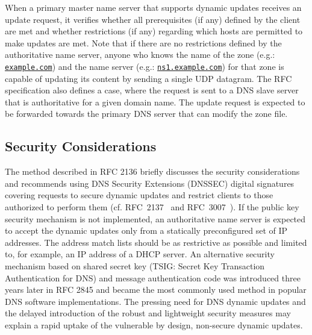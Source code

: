 When a primary master name server that supports dynamic updates receives an update request, it verifies whether all prerequisites (if any) defined by the %
client are met and whether restrictions (if any) regarding which hosts are permitted to make updates are met.
Note that if there are no restrictions defined by the authoritative name server, anyone who knows the name of the zone (e.g.: \texttt{\url{example.com}}) and the name server (e.g.: \texttt{\url{ns1.example.com}}) for that zone is capable of updating its content by sending a single UDP datagram.
%
%
The RFC specification also defines a case, where the request is sent to a DNS slave server that is authoritative for a given domain name.
The update request is expected to be forwarded towards the primary DNS server that can modify the zone file.

\subsection{Security Considerations}
The method described in RFC 2136 %
briefly discusses the security considerations and recommends using DNS Security Extensions (DNSSEC) digital signatures covering requests to secure dynamic updates and restrict %
clients to those authorized to perform them %
(cf. RFC~2137~\cite{rfc2137} %
and RFC~3007~\cite{rfc3007}).
If the public key security mechanism is not implemented, an authoritative name server is expected to accept the dynamic updates only from a statically preconfigured set of IP addresses.
The address match lists should be as restrictive as possible and limited to, for example, an IP address of a DHCP server.
An alternative security mechanism based on shared secret key (TSIG: Secret Key Transaction Authentication for DNS) and message authentication code was introduced three years later in RFC 2845 \cite{rfc2845} and became the most commonly used method in popular DNS software implementations.
%
%
The pressing need for DNS dynamic updates and the delayed introduction of the robust and lightweight security measures may explain a rapid uptake of the vulnerable by design, non-secure dynamic updates.



